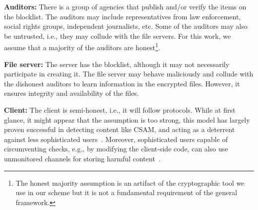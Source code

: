 \enumListStart


	\item \textbf{Auditors:} There is a group of agencies that publish and/or verify the items on the blocklist. 
	The auditors may include representatives from law enforcement, social rights groups, 
	independent journalists, etc. Some of the auditors may also be untrusted, i.e., 
	they may collude with the file servers. For this work, we assume that a majority of the auditors are honest\footnote{The honest majority assumption is an artifact of the cryptographic tool we use in our scheme but it is not a fundamental requirement of the general framework.}.
        
	\item \textbf{File server:} The server has the blocklist, although it may not necessarily participate 
	in creating it. The file server may behave maliciously and collude 
with the dishonest auditors to learn information in the encrypted files. However, it ensures 
	integrity and availability of the files. 

	\item \textbf{Client:} The client is semi-honest, i.e., it will follow protocols. While at first glance, it might appear that the assumption is too strong, this model has largely proven successful in detecting content 
like CSAM, and acting as a deterrent against less sophisticated users~\cite{kulshrestha2021identifying,scheffler2023public,bhowmick2021apple}. 
Moreover, sophisticated users capable of circumventing checks, e.g., by modifying the client-side code, can also use unmonitored channels for storing harmful content~\cite{kulshrestha2021identifying,scheffler2023public,bhowmick2021apple}. 

	
\enumListEnd

